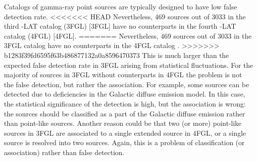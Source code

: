 Catalogs of gamma-ray point sources are typically designed to have low false detection rate. 
<<<<<<< HEAD
Nevertheless, 469 sources out of 3033 in the third \Fermi-LAT catalog (3FGL) [3FGL] have no counterparts 
in the fourth \Fermi-LAT catalog (4FGL) [4FGL].
=======
Nevertheless, 469 sources out of 3033 in the 3FGL catalog \citep{2015ApJS..218...23A} have no counterparts 
in the 4FGL catalog \citep{2020ApJS..247...33A}.
>>>>>>> b1283f39fd6595f63b486877132a0a8596470373
This is much larger than the expected false detection rate in 3FGL arising from statistical fluctuations.
For the majority of sources in 3FGL without counterparts in 4FGL the problem is not the false detection, 
but rather the association.
For example, some sources can be detected due to deficiencies in the Galactic diffuse emission model.
In this case, the statistical significance of the detection is high, but the association is wrong: the sources should be classified as
a part of the Galactic diffuse emission rather than point-like sources.
Another reason could be that two (or more) point-like sources in 3FGL are associated to a single extended source in 4FGL,
or a single source is resolved into two sources.
Again, this is a problem of classification (or association) rather than false detection.

